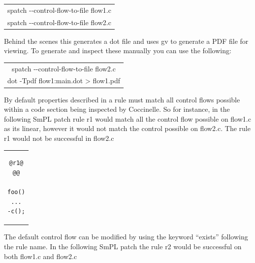 \begin{center}
\begin{tabular}{c}
spatch -{}-control-flow-to-file flow1.c \\
spatch -{}-control-flow-to-file flow2.c
\end{tabular}
\end{center}




Behind the scenes this generates a dot file and uses gv to generate
a PDF file for viewing. To generate and inspect these manually you
can use the following:

\begin{center}
\begin{tabular}{c}
spatch -{}-control-flow-to-file flow2.c \\
dot -Tpdf flow1:main.dot > flow1.pdf
\end{tabular}
\end{center}

By default properties described in a rule must match all control
flows possible within a code section being inspected by Coccinelle.
So for instance, in the following SmPL patch rule r1 would match all
the control flow possible on flow1.c as its linear, however it would
not match the control possible on flow2.c. The rule r1 would not
be successful in flow2.c

\begin{center}
\begin{tabular}{c}
\begin{lstlisting}[language=Cocci]
@r1@
@@

foo()
...
-c();

\end{lstlisting}\\
\end{tabular}
\end{center}

The default control flow can be modified by using the keyword ``exists''
following the rule name. In the following SmPL patch the rule r2 would
be successful on both flow1.c and flow2.c

